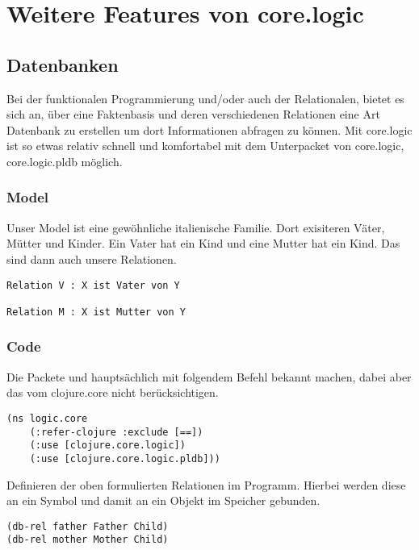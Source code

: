 \section{Weitere Features von core.logic} \label{sec:features}

\subsection{Datenbanken}

Bei der funktionalen Programmierung und/oder auch der Relationalen, bietet es sich an, über eine Faktenbasis und deren verschiedenen Relationen eine Art Datenbank zu erstellen um dort Informationen abfragen zu können. Mit core.logic ist so etwas relativ schnell und komfortabel mit dem Unterpacket von core.logic, core.logic.pldb möglich.

\subsubsection{Model}

Unser Model ist eine gewöhnliche italienische Familie. Dort exisiteren Väter, Mütter und Kinder. Ein Vater hat ein Kind und eine Mutter hat ein Kind. Das sind dann auch unsere Relationen.

\begin{lstlisting}
Relation V : X ist Vater von Y

Relation M : X ist Mutter von Y
\end{lstlisting}

\subsubsection{Code}

Die Packete  und hauptsächlich  mit folgendem Befehl bekannt machen, dabei aber das \code{==} vom clojure.core nicht berücksichtigen.

\begin{lstlisting}
(ns logic.core	
	(:refer-clojure :exclude [==])
	(:use [clojure.core.logic])
  	(:use [clojure.core.logic.pldb]))
\end{lstlisting}

Definieren der oben formulierten Relationen im Programm. Hierbei werden diese an ein Symbol und damit an ein Objekt im Speicher gebunden.

\begin{lstlisting}
(db-rel father Father Child)
(db-rel mother Mother Child)
\end{lstlisting}

